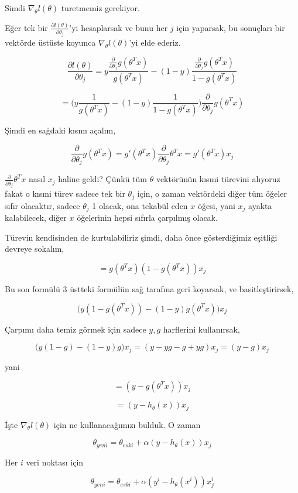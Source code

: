 \documentclass[12pt,fleqn]{article}\usepackage{../../common}
\begin{document}
Simdi $\nabla_\theta l(\theta)$ turetmemiz gerekiyor.

Eğer tek bir $\frac{\partial l(\theta)}{\partial \theta_j}$'yi hesaplarsak ve
bunu her $j$ için yaparsak, bu sonuçları bir vektörde üstüste koyunca
$\nabla_\theta l(\theta)$'yi elde ederiz.

$$ 
\frac{\partial l(\theta)}{\partial \theta_j} =
y \frac{\frac{\partial }{\partial \theta_j}g(\theta^Tx) }{g(\theta^Tx)}  -
(1-y) \frac{\frac{\partial }{\partial \theta_j}g(\theta^Tx) }{1-g(\theta^Tx)} 
$$

$$ 
= \big(
y  \frac{1}{g(\theta^Tx)}  -
(1-y) 
\frac{1}{1-g(\theta^Tx)} 
\big)
\frac{\partial }{\partial \theta_j}g(\theta^Tx)
$$

Şimdi en sağdaki kısmı açalım,

$$ 
\frac{\partial }{\partial \theta_j}g(\theta^Tx) 
= g'(\theta^Tx) \frac{\partial }{\partial \theta_j} \theta^Tx 
= g'(\theta^Tx) x_j 
$$

$\frac{\partial }{\partial \theta_j} \theta^Tx$ nasıl $x_j$ haline geldi?  Çünkü
tüm $\theta$ vektörünün kısmi türevini alıyoruz fakat o kısmi türev sadece tek
bir $\theta_j$ için, o zaman vektördeki diğer tüm öğeler sıfır olacaktır, sadece
$\theta_j$ 1 olacak, ona tekabül eden $x$ öğesi, yani $x_j$ ayakta kalabilecek,
diğer $x$ öğelerinin hepsi sıfırla çarpılmış olacak.

Türevin kendisinden de kurtulabiliriz şimdi, daha önce gösterdiğimiz eşitliği
devreye sokalım,

$$ 
= g(\theta^Tx)(1-g(\theta^Tx)) x_j 
$$

Bu son formülü 3 üstteki formülün sağ tarafına geri koyarsak, ve
basitleştirirsek,

$$
\big(
y(1-g(\theta^Tx)) - (1-y)g(\theta^T x)
\big) x_j
 $$

Çarpımı daha temiz görmek için sadece $y,g$ harflerini kullanırsak,

$$
\big(y(1-g) - (1-y)g \big) x_j =
(y - yg - g + yg)x_j = (y - g)x_j
 $$

yani

$$
= (y - g(\theta^Tx))x_j
$$

$$
= (y - h_\theta(x))x_j
$$

İşte $\nabla_\theta l(\theta)$ için ne kullanacağımızı bulduk. O zaman

$$ \theta_{yeni} = \theta_{eski} + \alpha (y - h_\theta(x))x_j $$

Her $i$ veri noktası için

$$ \theta_{yeni} = \theta_{eski} + \alpha (y^{i} - h_\theta(x^{i}))x^{i}_j $$
\end{document}
